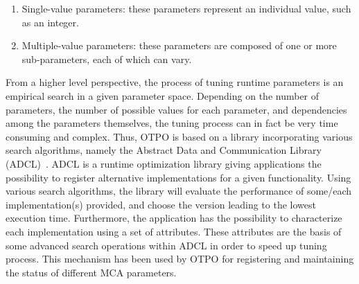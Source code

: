 \begin{enumerate}
\item Single-value parameters: these parameters represent an
  individual value, such as an integer.
\item Multiple-value parameters: these parameters are composed of
  one or more sub-parameters, each of which can vary.
\end{enumerate}

From a higher level perspective, the process of tuning runtime parameters is an empirical search in a given parameter space. Depending on the number of parameters, the number of possible values for each parameter, and dependencies among the parameters themselves, the tuning process can in fact be very time consuming and complex. Thus, OTPO is based on a library incorporating various search algorithms, namely the Abstract Data and Communication Library (ADCL)~\cite{ADCL}. ADCL is a runtime optimization library giving applications the possibility to register alternative implementations for a given functionality. Using various search algorithms, the library will evaluate the performance of some/each implementation(s) provided, and choose the version leading to the lowest execution time. Furthermore, the application has the possibility to characterize each implementation using a set of attributes. These attributes are the basis of some advanced search operations within ADCL in order to speed up tuning process. This mechanism has been used by OTPO for registering and maintaining the status of different MCA parameters. 
